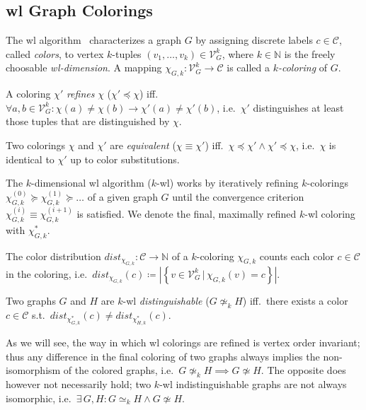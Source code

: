 \subsection{\acl{wl} Graph Colorings}%
\label{sec:related:character:wl}

The \acf{wl} algorithm~\cite{Weisfeiler1968}\cite{Cai1992} characterizes a graph $G$ by assigning discrete labels $c \in \mathcal{C}$, called \textit{colors}, to vertex $k$-tuples $(v_1, \dots, v_k) \in \mathcal{V}_G^k$, where $k \in \mathbb{N}$ is the freely choosable \textit{\ac{wl}-dimension}.
A mapping $\chi_{G, k}: \mathcal{V}_G^k \to \mathcal{C}$ is called a \textit{$k$-coloring} of $G$.
\begin{defn}
	A coloring $\chi'$ \textit{refines} $\chi$ ($\chi' \preceq \chi$) iff.\ $\forall a, b \in \mathcal{V}_G^k: \chi(a) \neq \chi(b) \rightarrow \chi'(a) \neq \chi'(b)$, i.e.\ $\chi'$ distinguishes at least those tuples that are distinguished by $\chi$.
\end{defn}
\begin{defn}
	Two colorings $\chi$ and $\chi'$ are \textit{equivalent} ($\chi \equiv \chi'$) iff.\ $\chi \preceq \chi' \land \chi' \preceq \chi$, i.e.\ $\chi$ is identical to $\chi'$ up to color substitutions.
\end{defn}
The $k$-dimensional \ac{wl} algorithm ($k$-\acs{wl}) works by iteratively refining $k$-colorings $\chi_{G, k}^{(0)} \succeq \chi_{G, k}^{(1)} \succeq \dots$ of a given graph $G$ until the convergence criterion $\chi_{G, k}^{(i)} \equiv \chi_{G, k}^{(i+1)}$ is satisfied.
We denote the final, maximally refined $k$-\acs{wl} coloring with $\chi^{*}_{G, k}$.
\begin{defn}
	The color distribution $\mathit{dist}_{\chi_{G, k}}: \mathcal{C} \to \mathbb{N}$ of a $k$-coloring $\chi_{G, k}$ counts each color $c \in \mathcal{C}$ in the coloring, i.e.\ $\mathit{dist}_{\chi_{G, k}}(c) \coloneqq \left|\left\{ v \in \mathcal{V}_G^k\, |\, \chi_{G, k}(v) = c \right\}\right|$. %
\end{defn}
\begin{defn}\label{defn:related:wl-distinguishable}
	Two graphs $G$ and $H$ are $k$-\acs{wl} \textit{distinguishable} ($G \mathrel{{\not\simeq}_k} H$) iff.\ there exists a color $c \in \mathcal{C}$ s.t.\ $\mathit{dist}_{\chi^{*}_{G, k}}(c) \neq \mathit{dist}_{\chi^{*}_{H, k}}(c)$.
\end{defn}
As we will see, the way in which \ac{wl} colorings are refined is vertex order invariant;
thus any difference in the final coloring of two graphs always implies the non-isomorphism of the colored graphs, i.e.\ $G \mathrel{{\not\simeq}_k} H \implies G \not\simeq H$.
The opposite does however not necessarily hold;
two $k$-\acs{wl} indistinguishable graphs are not always isomorphic, i.e.\ $\exists\, G, H: G \mathrel{{\simeq}_k} H \land G \not\simeq H$. %

